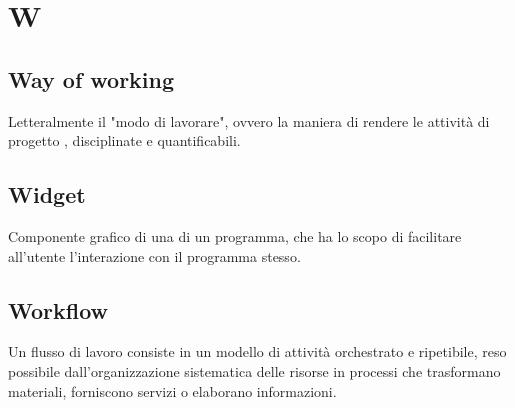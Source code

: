 \section*{W}
\markright{}

\subsection*{Way of working}
Letteralmente il "modo di lavorare", ovvero la maniera di rendere le attività di progetto , disciplinate e quantificabili.

\subsection*{Widget}
Componente grafico di una  di un programma, che ha lo scopo di facilitare all'utente l'interazione con il programma stesso.

\subsection*{Workflow}
Un flusso di lavoro consiste in un modello di attività orchestrato e ripetibile, reso possibile dall'organizzazione sistematica delle risorse in processi che trasformano materiali, forniscono servizi o elaborano informazioni.